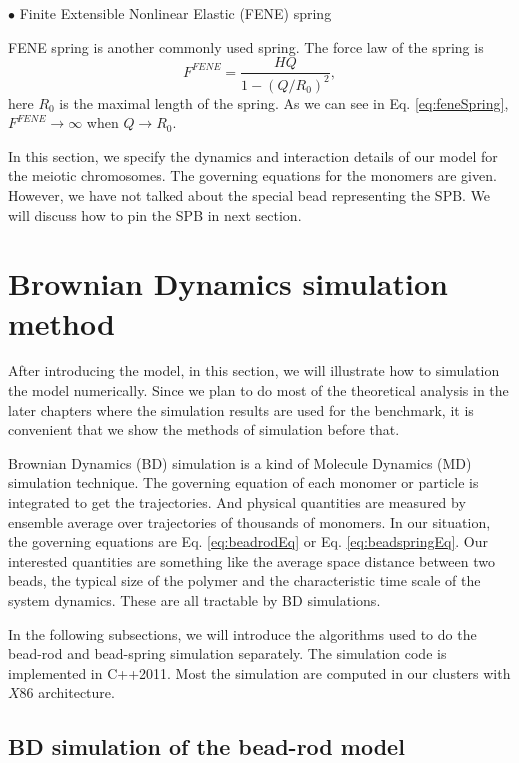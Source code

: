$\bullet$ Finite Extensible Nonlinear Elastic (FENE) spring

FENE spring is another commonly used spring. The force law of the spring is
\begin{equation}
    \label{eq:feneSpring}
    F^{FENE} = \frac{H Q}{1-(Q/R_0)^2},
\end{equation}
here $R_0$ is the maximal length of the spring. As we can see in Eq. \eqref{eq:feneSpring}, $F^{FENE}\rightarrow\infty$ when $Q\rightarrow R_0$. 


In this section, we specify the dynamics and interaction details of our model for the meiotic chromosomes. The governing equations for the monomers are given. However, we have not talked about the special bead representing the SPB. We will discuss how to pin the SPB in next section.


\section{Brownian Dynamics simulation method}
\label{sec:brownian_dynamics_simulation_method}
After introducing the model, in this section, we will illustrate how to simulation the model numerically. Since we plan to do most of the theoretical analysis in the later chapters where the simulation results are used for the benchmark, it is convenient that we show the methods of simulation before that. 

Brownian Dynamics (BD) simulation is a kind of Molecule Dynamics (MD) simulation technique. The governing equation of each monomer or particle is integrated to get the trajectories. And physical quantities are measured by ensemble average over trajectories of thousands of monomers. In our situation, the governing equations are Eq. \eqref{eq:beadrodEq} or Eq. \eqref{eq:beadspringEq}. Our interested quantities are something like the average space distance between two beads, the typical size of the polymer and the characteristic time scale of the system dynamics. These are all tractable by BD simulations. 

In the following subsections, we will introduce the algorithms used to do the bead-rod and bead-spring simulation separately. The simulation code is implemented in C++2011. Most the simulation are computed in our clusters with $X86$ architecture.

\subsection{BD simulation of the bead-rod model}
\label{sub:bd_of_bead_rod_model}

